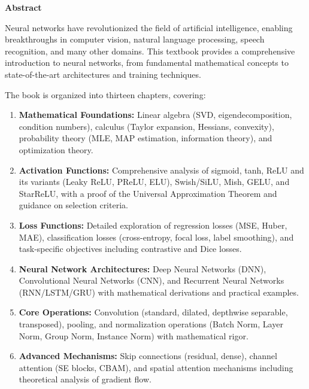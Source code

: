 \newpage
\thispagestyle{empty}

\begin{center}
    \Large\textbf{Abstract}
\end{center}

\vspace{1cm}

Neural networks have revolutionized the field of artificial intelligence, enabling breakthroughs in computer vision, natural language processing, speech recognition, and many other domains. This textbook provides a comprehensive introduction to neural networks, from fundamental mathematical concepts to state-of-the-art architectures and training techniques.

The book is organized into thirteen chapters, covering:

\begin{enumerate}
    \item \textbf{Mathematical Foundations:} Linear algebra (SVD, eigendecomposition, condition numbers), calculus (Taylor expansion, Hessians, convexity), probability theory (MLE, MAP estimation, information theory), and optimization theory.
    
    \item \textbf{Activation Functions:} Comprehensive analysis of sigmoid, tanh, ReLU and its variants (Leaky ReLU, PReLU, ELU), Swish/SiLU, Mish, GELU, and StarReLU, with a proof of the Universal Approximation Theorem and guidance on selection criteria.
    
    \item \textbf{Loss Functions:} Detailed exploration of regression losses (MSE, Huber, MAE), classification losses (cross-entropy, focal loss, label smoothing), and task-specific objectives including contrastive and Dice losses.
    
    \item \textbf{Neural Network Architectures:} Deep Neural Networks (DNN), Convolutional Neural Networks (CNN), and Recurrent Neural Networks (RNN/LSTM/GRU) with mathematical derivations and practical examples.
    
    \item \textbf{Core Operations:} Convolution (standard, dilated, depthwise separable, transposed), pooling, and normalization operations (Batch Norm, Layer Norm, Group Norm, Instance Norm) with mathematical rigor.
    
    \item \textbf{Advanced Mechanisms:} Skip connections (residual, dense), channel attention (SE blocks, CBAM), and spatial attention mechanisms including theoretical analysis of gradient flow.
    

\end{enumerate}

